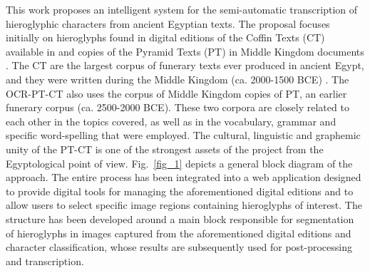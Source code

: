 \documentclass[10pt,onecolumn,letterpaper]{article}
\begin{document}
This work proposes an intelligent system for the semi-automatic transcription of hieroglyphic characters from ancient Egyptian texts. The proposal focuses initially on hieroglyphs found in digital editions of the Coffin Texts (CT) available in \cite{Buck61} and copies of the Pyramid Texts (PT) in Middle Kingdom documents \cite{Allen06}. The CT are the largest corpus of funerary texts ever produced in ancient Egypt, and they were written during the Middle Kingdom (ca. 2000-1500 BCE) \cite{willems2014, gracia2024}. The OCR-PT-CT also uses the corpus of Middle Kingdom copies of PT, an earlier funerary corpus (ca. 2500-2000 BCE). These two corpora are closely related to each other in the topics covered, as well as in the vocabulary, grammar and specific word-spelling that were employed. The cultural, linguistic and graphemic unity of the PT-CT is one of the strongest assets of the project from the Egyptological point of view. Fig.~\ref{fig_1} depicts a general block diagram of the approach. %
The entire process has been integrated into a web application designed to provide digital tools for managing the aforementioned digital editions and to allow users to select specific image regions containing hieroglyphs of interest. The structure has been developed around a main block responsible for segmentation of hieroglyphs in images captured from the aforementioned digital editions and character classification, whose results are subsequently used for post-processing and transcription.
\end{document}
